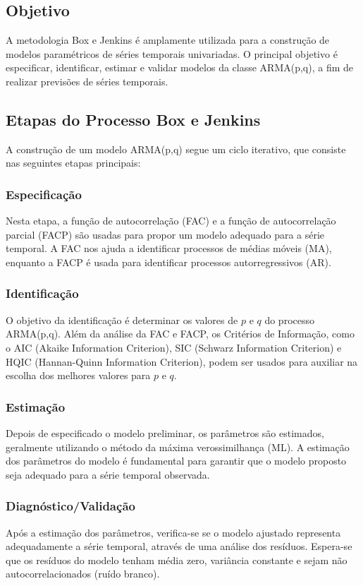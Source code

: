 \documentclass{sciposter}
\begin{document}
\begin{multicols}{3}
\subsection{Objetivo}
A metodologia Box e Jenkins é amplamente utilizada para a construção de modelos paramétricos de séries temporais univariadas. O principal objetivo é especificar, identificar, estimar e validar modelos da classe ARMA(p,q), a fim de realizar previsões de séries temporais.

\subsection{Etapas do Processo Box e Jenkins}
A construção de um modelo ARMA(p,q) segue um ciclo iterativo, que consiste nas seguintes etapas principais:

\subsubsection{Especificação}
Nesta etapa, a função de autocorrelação (FAC) e a função de autocorrelação parcial (FACP) são usadas para propor um modelo adequado para a série temporal. A FAC nos ajuda a identificar processos de médias móveis (MA), enquanto a FACP é usada para identificar processos autorregressivos (AR).

\subsubsection{Identificação}
O objetivo da identificação é determinar os valores de $p$ e $q$ do processo ARMA(p,q). Além da análise da FAC e FACP, os Critérios de Informação, como o AIC (Akaike Information Criterion), SIC (Schwarz Information Criterion) e HQIC (Hannan-Quinn Information Criterion), podem ser usados para auxiliar na escolha dos melhores valores para $p$ e $q$.

\subsubsection{Estimação}
Depois de especificado o modelo preliminar, os parâmetros são estimados, geralmente utilizando o método da máxima verossimilhança (ML). A estimação dos parâmetros do modelo é fundamental para garantir que o modelo proposto seja adequado para a série temporal observada.

\subsubsection{Diagnóstico/Validação}
Após a estimação dos parâmetros, verifica-se se o modelo ajustado representa adequadamente a série temporal, através de uma análise dos resíduos. Espera-se que os resíduos do modelo tenham média zero, variância constante e sejam não autocorrelacionados (ruído branco).


\end{multicols}
\end{document}
